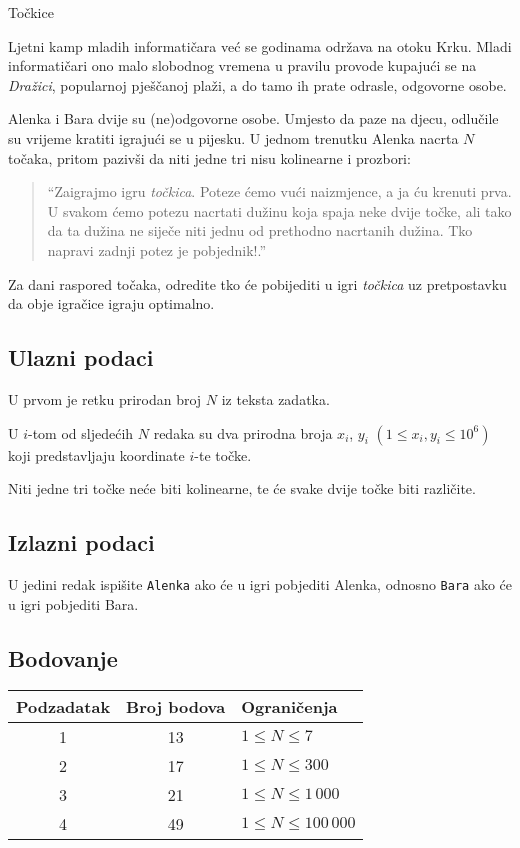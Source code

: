 \begin{statement}[
  problempoints=100,
  timelimit=1 sekunda,
  memorylimit=512 MiB,
]{Točkice}

Ljetni kamp mladih informatičara već se godinama održava na otoku Krku.  Mladi
informatičari ono malo slobodnog vremena u pravilu provode kupajući se na
\textit{Dražici}, popularnoj pješčanoj plaži, a do tamo ih prate odrasle,
odgovorne osobe.

Alenka i Bara dvije su (ne)odgovorne osobe. Umjesto da paze na djecu, odlučile
su vrijeme kratiti igrajući se u pijesku. U jednom trenutku Alenka nacrta $N$
točaka, pritom pazivši da niti jedne tri nisu kolinearne i prozbori:
\begin{quote}
``Zaigrajmo igru \textit{točkica}. Poteze ćemo vući naizmjence, a ja ću krenuti
  prva. U svakom ćemo potezu nacrtati dužinu koja spaja neke dvije točke, ali
  tako da ta dužina ne siječe niti jednu od prethodno nacrtanih dužina. Tko
  napravi zadnji potez je pobjednik!.''
\end{quote}
Za dani raspored točaka, odredite tko će pobijediti u igri \textit{točkica} uz
pretpostavku da obje igračice igraju optimalno.

\subsection*{Ulazni podaci}
U prvom je retku prirodan broj $N$ iz teksta zadatka.

U $i$-tom od sljedećih $N$ redaka su dva prirodna broja $x_i$, $y_i$ $(1 \leq
x_i, y_i \leq 10^6)$ koji predstavljaju koordinate $i$-te točke.

Niti jedne tri točke neće biti kolinearne, te će svake dvije točke biti različite.
\subsection*{Izlazni podaci}
U jedini redak ispišite \texttt{Alenka} ako će u igri pobjediti Alenka,
odnosno \texttt{Bara} ako će u igri pobjediti Bara.

\subsection*{Bodovanje}
{\renewcommand{\arraystretch}{1.4}
  \setlength{\tabcolsep}{6pt}
  \begin{tabular}{ccl}
 Podzadatak & Broj bodova & Ograničenja \\ \midrule
  1 & 13 & $1 \le N \le 7$\\
  2 & 17 & $1 \le N \le 300$\\
  3 & 21 & $1 \le N \le 1\,000$\\
  4 & 49 & $1 \le N \le 100\,000$\\
\end{tabular}}


\end{statement}
